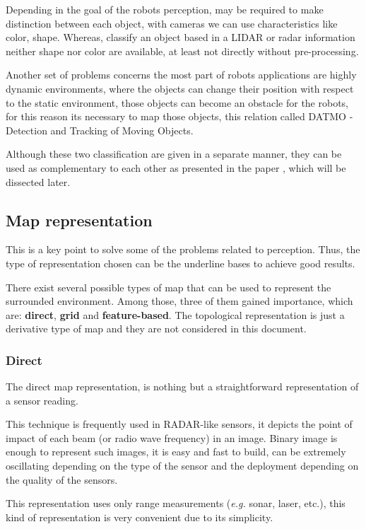 Depending in the goal of the robots perception, may be required to make distinction between each object, with cameras we can use characteristics like color, shape. Whereas, classify an object based in a LIDAR or radar information neither shape nor color are available, at least not directly without pre-processing.

Another set of problems concerns the most part of robots applications are highly dynamic environments, where the objects can change their position with respect to the static environment, those objects can become an obstacle for the robots, for this reason its necessary to map those objects, this relation called DATMO - Detection and Tracking of Moving Objects.

Although these two classification are given in a separate manner, they can be used as complementary to each other as presented in the paper \cite{Wang04a}, which will be dissected later.

\subsection{Map representation}

This is a key point to solve some of the problems related to perception. Thus, the type of representation chosen can be the underline bases to achieve good results.

There exist several possible types of map that can be used to represent the surrounded environment. Among those, three of them gained importance, which are: \textbf{direct}, \textbf{grid} and \textbf{feature-based}. The topological representation is just a derivative type of map and they are not considered in this document.

\subsubsection{Direct}

The direct map representation, is nothing but a straightforward representation of a sensor reading. 

This technique is frequently used in RADAR-like sensors, it depicts the point of impact of each beam (or radio wave frequency) in an image. Binary image is enough to represent such images, it is easy and fast to build, can be extremely oscillating depending on the type of the sensor and the deployment depending on the quality of the sensors.

This representation uses only range measurements (\textit{e.g.} sonar, laser, etc.), this kind of representation is very convenient due to its simplicity. 


